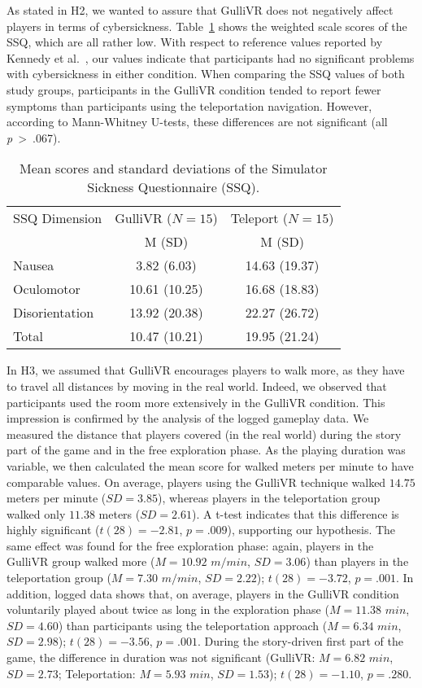 \documentclass{sigchi}
\begin{document}
As stated in H2, we wanted to assure that GulliVR does not negatively affect players in terms of cybersickness. Table~\ref{tab:SSQ} shows the weighted scale scores of the SSQ, which are all rather low.  
With respect to reference values reported by Kennedy et al.~\cite{kennedy1993simulator}, our values indicate that participants had no significant problems with cybersickness in either condition. When comparing the SSQ values of both study groups, participants in the GulliVR condition tended to report fewer symptoms than participants using the teleportation navigation. 
However, according to Mann-Whitney U-tests, these differences are not significant (all \textit{p}~>~.067).

\begin{table}
  \caption{Mean scores and standard deviations of the Simulator Sickness Questionnaire (SSQ).}
  \label{tab:SSQ}
  \begin{tabular}{lcc}
    \toprule
    SSQ Dimension & GulliVR ($N = 15$) & Teleport ($N = 15$)\\
     & M (SD)	& M (SD) \\
    \midrule
    Nausea & 3.82 (6.03) & 14.63 (19.37) \\
    Oculomotor & 10.61 (10.25) & 16.68 (18.83)\\
    Disorientation & 13.92 (20.38) & 22.27 (26.72)\\
    Total & 10.47 (10.21) & 19.95 (21.24)\\
  \bottomrule
\end{tabular}
\end{table}

In H3, we assumed that GulliVR encourages players to walk more, as they have to travel all distances by moving in the real world. Indeed, we observed that participants used the room more extensively in the GulliVR condition. This impression is confirmed by the analysis of the logged gameplay data. We measured the distance that players covered (in the real world) during the story part of the game and in the free exploration phase. As the playing duration was variable, we then calculated the mean score for walked meters per minute to have comparable values. On average, players using the GulliVR technique walked $14.75$ meters per minute ($SD=3.85$), whereas players in the teleportation group walked only $11.38$ meters ($SD=2.61$). A t-test indicates that this difference is highly significant ($t(28)=-2.81$, $p=.009$), supporting our hypothesis. The same effect was found for the free exploration phase: again, players in the GulliVR group walked more ($M=10.92$ $m/min$, $SD=3.06$) than players in the teleportation group ($M=7.30$ $m/min$, $SD=2.22$); $t(28)=-3.72$, $p=.001$. In addition, logged data shows that, on average, players in the GulliVR condition voluntarily played about twice as long in the exploration phase ($M=11.38$ $min$, $SD=4.60$) than participants using the teleportation approach ($M=6.34$ $min$, $SD=2.98$); $t(28)=-3.56$, $p=.001$. During the story-driven first part of the game, the difference in duration was not significant (GulliVR: $M=6.82$ $min$, $SD=2.73$; Teleportation: $M=5.93$ $min$, $SD=1.53$); $t(28)=-1.10$, $p=.280$.
\end{document}

